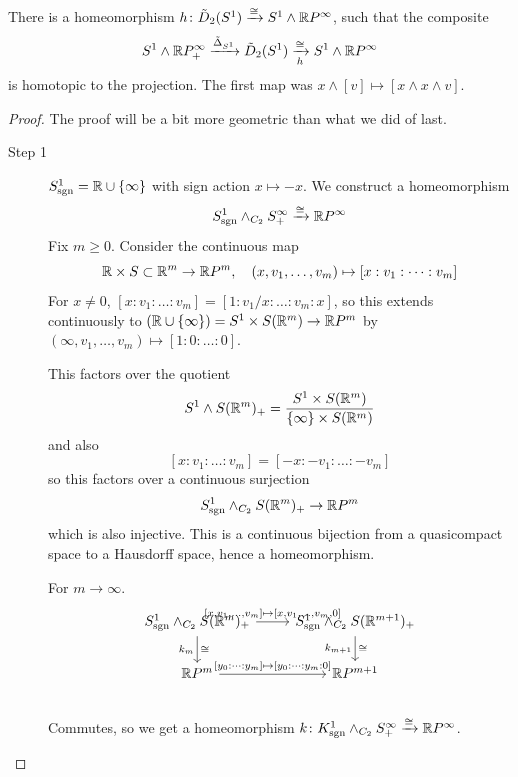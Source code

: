 \documentclass[language=english]{TemplateLecture}
\begin{document}
\begin{proposition}
    There is a homeomorphism \(h\colon \tilde D_2(S^1)\xrightarrow{\cong} S^1 \wedge \mathbb{R} P^\infty\), such that the composite
    \[S^1\wedge \mathbb{R} P^\infty_+ \xrightarrow{\tilde \Delta_{S^1}} \tilde D_2(S^1)\xrightarrow[h]{\cong} S^1 \wedge \mathbb{R} P^\infty\]
    is homotopic to the projection. The first map was \(x\wedge [v] \mapsto [x\wedge x\wedge v]\).
\end{proposition}

\begin{proof}
    The proof will be a bit more geometric than what we did of last.
    \begin{description}
        \item[Step 1] \(S^1_{\text{sgn}} = \mathbb{R}\cup \{\infty\}\) with sign action \(x\mapsto -x\). We construct a homeomorphism
        \[S^1_{\mathrm{sgn}} \wedge_{C_2} S^\infty_+ \xrightarrow{\cong} \mathbb{R} P^\infty\]
        Fix \(m\geq 0\). Consider the continuous map
        \[\mathbb{R} \times S \subset \mathbb{R}^m \to \mathbb{R} P^m, \quad (x, v_1, \dots, v_m) \mapsto [x:v_1: \dots : v_m]\]
        For \(x\neq 0\), \([x:v_1: \dots : v_m] = [1:v_1/x : \dots : v_m: x]\), so this extends continuously to \((\mathbb{R} \cup\{\infty\})=S^1\times S(\mathbb{R} ^m) \to \mathbb{R} P^m\) by \((\infty, v_1, \dots, v_m) \mapsto [1: 0 : \dots : 0]\).

        This factors over the quotient
        \[S^1 \wedge S(\mathbb{R} ^m)_+ = \frac{S^1\times S(\mathbb{R} ^m)}{\{\infty\} \times S(\mathbb{R}^m)}\]
        and also
        \[[x:v_1: \dots : v_m] = [-x : -v_1 : \dots : -v_m]\]
        so this factors over a continuous surjection
        \[S^1_{\mathrm{sgn}}\wedge_{C_2} S(\mathbb{R} ^m)_+ \to \mathbb{R} P^m\]
        which is also injective. This is a continuous bijection from a quasicompact space to a Hausdorff space, hence a homeomorphism.
        
        For \(m\to \infty\).
        \[\begin{tikzcd}
            S^1_{\mathrm{sgn}} \wedge_{C_2} S(\ir^m)_+ \ar[r, "{[x, v_1, \dots, v_m]\mapsto [x, v_1,\dots, v_m, 0]}"] \ar[d, "\cong", "k_m"'] & S^1_{\mathrm{sgn}}\wedge_{C_2}S(\ir^{m+1})_+ \ar[d, "\cong", "k_{m+1}"'] \\
            \ir P^m \ar[r, "{[y_0: \dots : y_m]\mapsto [y_0: \dots : y_m : 0]}"] & \ir P^{m+1} \\
        \end{tikzcd}\]
        Commutes, so we get a homeomorphism \(k\colon K^1_{\mathrm{sgn}} \wedge_{C_2} S^\infty_+ \xrightarrow{\cong} \mathbb{R} P^\infty\).


\end{description}
\end{proof}
\end{document}
